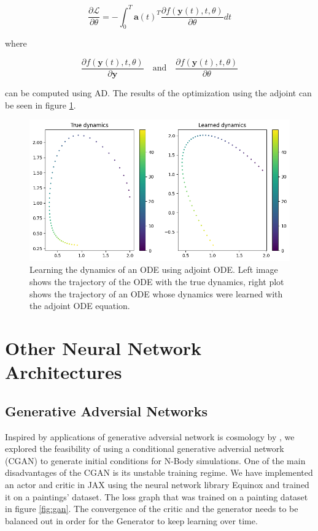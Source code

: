 \documentclass{article}
\begin{document}
{\begin{appendices}
\begin{equation}
\frac{\partial \mathcal{L}}{\partial \theta} = -\int_0^T \mathbf{a}(t) ^T \frac{\partial f(\mathbf{y}(t), t, \theta)}{\partial \theta} dt
\end{equation}

where 

\begin{equation}
\frac{\partial f(\mathbf{y}(t), t, \theta)}{\partial \mathbf{y}} \quad \text{and} \quad \frac{\partial f(\mathbf{y}(t), t, \theta)}{\partial \theta}
\end{equation}

can be computed using AD. The results of the optimization using the adjoint can be seen in figure \ref{fig:ode-adjoint}.


\begin{figure}[h]
    \centering
    \includegraphics[width=0.75\linewidth]{img/ode_learning.png}
    \caption{Learning the dynamics of an ODE using adjoint ODE. Left image shows the trajectory of the ODE with the true dynamics, right plot shows the trajectory of an ODE whose dynamics were learned with the adjoint ODE equation.}
    \label{fig:ode-adjoint}
\end{figure}

\newpage
\section{Other Neural Network Architectures}
\subsection{Generative Adversial Networks}
\label{CGAN}

Inspired by applications of generative adversial network is cosmology by \cite{bernardini2022ember}, we explored the feasibility of using a conditional generative adversial network (CGAN) \citep{gauthier2014conditional} to generate initial conditions for N-Body simulations. One of the main disadvantages of the CGAN is its unstable training regime. We have implemented an actor and critic in {JAX} \citep{jax2018github} using the neural network library {Equinox} \citep{kidger2021equinox} and trained it on a paintings' dataset. The loss graph that was trained on a painting dataset in figure \ref{fig:gan}. The convergence of the critic and the generator needs to be balanced out in order for the Generator to keep learning over time. 


\end{appendices}}
\end{document}
